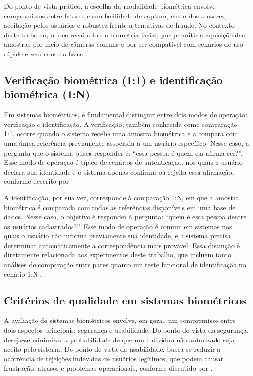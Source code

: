 Do ponto de vista prático, a escolha da modalidade biométrica envolve compromissos entre fatores como facilidade de captura, custo dos sensores, aceitação pelos usuários e robustez frente a tentativas de fraude. No contexto deste trabalho, o foco recai sobre a biometria facial, por permitir a aquisição das amostras por meio de câmeras comuns e por ser compatível com cenários de uso rápido e sem contato físico \cite{jain2004biometric}.

\subsection{Verificação biométrica (1:1) e identificação biométrica (1:N)}

Em sistemas biométricos, é fundamental distinguir entre dois modos de operação: verificação e identificação. A verificação, também conhecida como comparação 1:1, ocorre quando o sistema recebe uma amostra biométrica e a compara com uma única referência previamente associada a um usuário específico. Nesse caso, a pergunta que o sistema busca responder é: “essa pessoa é quem ela afirma ser?”. Esse modo de operação é típico de cenários de autenticação, nos quais o usuário declara sua identidade e o sistema apenas confirma ou rejeita essa afirmação, conforme descrito por \textcite{jain2004biometric}.

A identificação, por sua vez, corresponde à comparação 1:N, em que a amostra biométrica é comparada com todas as referências disponíveis em uma base de dados. Nesse caso, o objetivo é responder à pergunta: “quem é essa pessoa dentre os usuários cadastrados?”. Esse modo de operação é comum em sistemas nos quais o usuário não informa previamente sua identidade, e o sistema precisa determinar automaticamente a correspondência mais provável. Essa distinção é diretamente relacionada aos experimentos deste trabalho, que incluem tanto análises de comparação entre pares quanto um teste funcional de identificação no cenário 1:N \cite{jain2004biometric}.

\subsection{Critérios de qualidade em sistemas biométricos}

A avaliação de sistemas biométricos envolve, em geral, um compromisso entre dois aspectos principais: segurança e usabilidade. Do ponto de vista da segurança, deseja-se minimizar a probabilidade de que um indivíduo não autorizado seja aceito pelo sistema. Do ponto de vista da usabilidade, busca-se reduzir a ocorrência de rejeições indevidas de usuários legítimos, que podem causar frustração, atrasos e problemas operacionais, conforme discutido por \textcite{jain2004biometric}.

